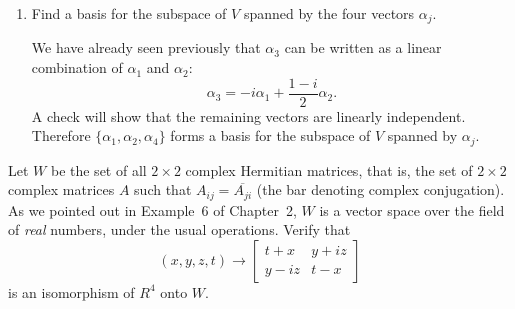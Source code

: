 \begin{enumerate}
\item Find a basis for the subspace of $V$ spanned by the four vectors
  $\alpha_j$.
  \begin{solution}
    We have already seen previously that $\alpha_3$ can be written as
    a linear combination of $\alpha_1$ and $\alpha_2$:
    \begin{equation*}
      \alpha_3 = -i\alpha_1 + \frac{1 - i}2\alpha_2.
    \end{equation*}
    A check will show that the remaining vectors are linearly
    independent. Therefore $\{\alpha_1,\alpha_2,\alpha_4\}$ forms a
    basis for the subspace of $V$ spanned by $\alpha_j$.
  \end{solution}
\end{enumerate}

 Let $W$ be the set of all $2\times2$ complex Hermitian
matrices, that is, the set of $2\times2$ complex matrices $A$ such
that $A_{ij} = \overline{A_{ji}}$ (the bar denoting complex
conjugation). As we pointed out in Example~6 of Chapter~2, $W$ is a
vector space over the field of {\em real} numbers, under the usual
operations. Verify that
\begin{equation*}
  (x,y,z,t)\rightarrow
  \begin{bmatrix}
    t + x & y + iz \\
    y - iz & t - x
  \end{bmatrix}
\end{equation*}
is an isomorphism of $R^4$ onto $W$.
